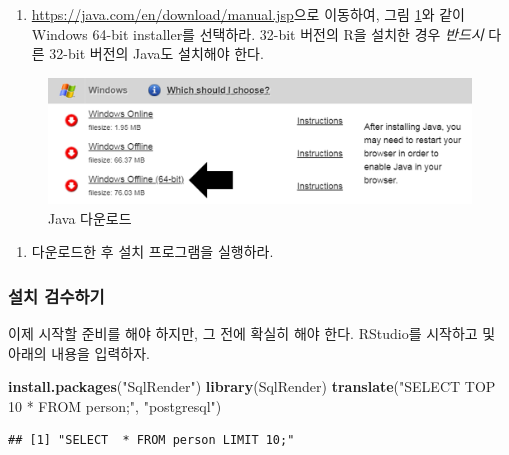\documentclass[11pt]{book}
\newenvironment{Shaded}{\begin{snugshade}}{\end{snugshade}}
\newcommand{\KeywordTok}[1]{\textcolor[rgb]{0.13,0.29,0.53}{\textbf{#1}}}
\newcommand{\StringTok}[1]{\textcolor[rgb]{0.31,0.60,0.02}{#1}}
\newcommand{\NormalTok}[1]{#1}
\providecommand{\tightlist}{%
  \setlength{\itemsep}{0pt}\setlength{\parskip}{0pt}}
\theoremstyle{definition}
\theoremstyle{definition}
\theoremstyle{definition}
\theoremstyle{remark}
\begin{document}
\begin{enumerate}
\def\labelenumi{\arabic{enumi}.}
\tightlist
\item
  \url{https://java.com/en/download/manual.jsp}으로 이동하여, 그림
  \ref{fig:downloadJava}와 같이 Windows 64-bit installer를 선택하라.
  32-bit 버전의 R을 설치한 경우 \emph{반드시} 다른 32-bit 버전의 Java도
  설치해야 한다.
\end{enumerate}

\begin{figure}

{\centering \includegraphics[width=1\linewidth]{images/OhdsiAnalyticsTools/downloadJava} 

}

\caption{Java 다운로드}\label{fig:downloadJava}
\end{figure}

\begin{enumerate}
\def\labelenumi{\arabic{enumi}.}
\setcounter{enumi}{1}
\tightlist
\item
  다운로드한 후 설치 프로그램을 실행하라.
\end{enumerate}

\subsubsection*{설치 검수하기}\label{-}

이제 시작할 준비를 해야 하지만, 그 전에 확실히 해야 한다. RStudio를
시작하고 및 아래의 내용을 입력하자.

\begin{Shaded}
\begin{Highlighting}[]
\KeywordTok{install.packages}\NormalTok{(}\StringTok{"SqlRender"}\NormalTok{)}
\KeywordTok{library}\NormalTok{(SqlRender)}
\KeywordTok{translate}\NormalTok{(}\StringTok{"SELECT TOP 10 * FROM person;"}\NormalTok{, }\StringTok{"postgresql"}\NormalTok{)}
\end{Highlighting}
\end{Shaded}

\begin{verbatim}
## [1] "SELECT  * FROM person LIMIT 10;"
\end{verbatim}
\end{document}
